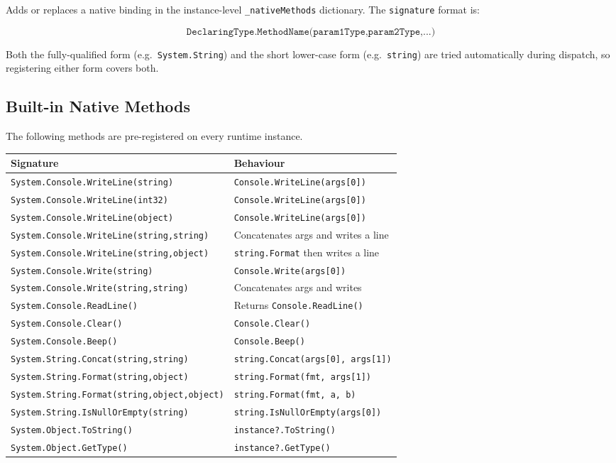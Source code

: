 \documentclass[11pt,a4paper]{article}
\newcommand{\code}[1]{\texttt{\small #1}}
\begin{document}
Adds or replaces a native binding in the instance-level
\code{\_nativeMethods} dictionary. The \code{signature} format is:

\[
\texttt{DeclaringType.MethodName(param1Type,param2Type,...)}
\]

Both the fully-qualified form (e.g.\ \texttt{System.String}) and the short
lower-case form (e.g.\ \texttt{string}) are tried automatically during
dispatch, so registering either form covers both.

\subsection{Built-in Native Methods}

The following methods are pre-registered on every runtime instance.

\begin{longtable}{lp{7.5cm}}
  \toprule
  \textbf{Signature} & \textbf{Behaviour} \\
  \midrule
  \endhead
  \texttt{System.Console.WriteLine(string)}        & \code{Console.WriteLine(args[0])} \\
  \texttt{System.Console.WriteLine(int32)}         & \code{Console.WriteLine(args[0])} \\
  \texttt{System.Console.WriteLine(object)}        & \code{Console.WriteLine(args[0])} \\
  \texttt{System.Console.WriteLine(string,string)} & Concatenates args and writes a line \\
  \texttt{System.Console.WriteLine(string,object)} & \code{string.Format} then writes a line \\
  \texttt{System.Console.Write(string)}            & \code{Console.Write(args[0])} \\
  \texttt{System.Console.Write(string,string)}     & Concatenates args and writes \\
  \texttt{System.Console.ReadLine()}               & Returns \code{Console.ReadLine()} \\
  \texttt{System.Console.Clear()}                  & \code{Console.Clear()} \\
  \texttt{System.Console.Beep()}                   & \code{Console.Beep()} \\
  \texttt{System.String.Concat(string,string)}     & \code{string.Concat(args[0], args[1])} \\
  \texttt{System.String.Format(string,object)}     & \code{string.Format(fmt, args[1])} \\
  \texttt{System.String.Format(string,object,object)} & \code{string.Format(fmt, a, b)} \\
  \texttt{System.String.IsNullOrEmpty(string)}     & \code{string.IsNullOrEmpty(args[0])} \\
  \texttt{System.Object.ToString()}                & \code{instance?.ToString()} \\
  \texttt{System.Object.GetType()}                 & \code{instance?.GetType()} \\
  \bottomrule
\end{longtable}
\end{document}
